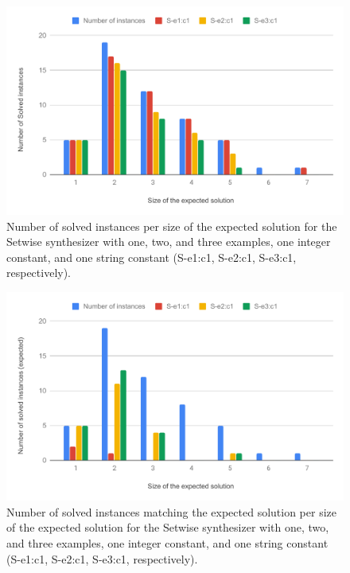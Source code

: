 \begin{figure}
  \centering
  \includegraphics[width=1.0\textwidth]{assets/bar-chart-solved-setwise.pdf}
  \caption{Number of solved instances per size of the expected solution for
    the Setwise synthesizer with one, two, and three examples, one integer
    constant, and one string constant (S-e1:c1, S-e2:c1, S-e3:c1, respectively).}
  \label{fig:bar-chart-solved-setwise}
\end{figure}

\begin{figure}
  \centering
  \includegraphics[width=1.0\textwidth]{assets/bar-chart-expected-setwise.pdf}
  \caption{Number of solved instances matching the expected solution per size of
    the expected solution for the Setwise synthesizer with one, two, and three
    examples, one integer constant, and one string constant (S-e1:c1, S-e2:c1,
    S-e3:c1, respectively).}
  \label{fig:bar-chart-expected-setwise}
\end{figure}

